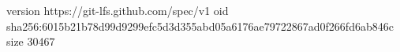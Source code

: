 version https://git-lfs.github.com/spec/v1
oid sha256:6015b21b78d99d9299efc5d3d355abd05a6176ae79722867ad0f266fd6ab846c
size 30467
